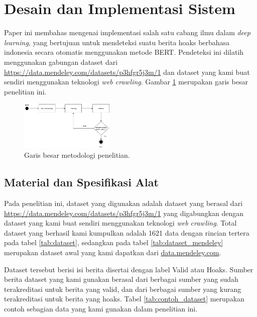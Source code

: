 \section{Desain dan Implementasi Sistem}
\label{sec:desainimplementasi}

Paper ini membahas mengenai implementasi salah satu cabang ilmu dalam \textit{deep learning}, yang bertujuan untuk mendeteksi suatu berita hoaks berbahasa indonesia secara otomatis menggunakan metode BERT. Pendeteksi ini dilatih menggunakan gabungan dataset dari \url{https://data.mendeley.com/datasets/p3hfgr5j3m/1} dan dataset yang kami buat sendiri menggunakan teknologi \textit{web crawling}. Gambar \ref{fig:metodologi} merupakan garis besar penelitian ini.

\begin{figure} [ht]
    \centering
    \includegraphics[width=0.4\textwidth]{gambar/Metodologi.png}
    \caption{Garis besar metodologi penelitian.}
    \label{fig:metodologi}
\end{figure}

\subsection{Material dan Spesifikasi Alat}

Pada penelitian ini, dataset yang digunakan adalah dataset yang berasal dari \url{https://data.mendeley.com/datasets/p3hfgr5j3m/1} yang digabungkan dengan dataset yang kami buat sendiri menggunakan teknologi \textit{web crawling}. Total dataset yang berhasil kami kumpulkan adalah 1621 data dengan rincian tertera pada tabel \ref{tab:dataset}, sedangkan pada tabel \ref{tab:dataset_mendeley} merupakan dataset awal yang kami dapatkan dari \url{data.mendeley.com}.

Dataset tersebut berisi isi berita disertai dengan label Valid atau Hoaks. Sumber berita dataset yang kami gunakan berasal dari berbagai sumber yang sudah terakreditasi untuk berita yang valid, dan dari berbagai sumber yang kurang terakreditasi untuk berita yang hoaks. Tabel \ref{tab:contoh_dataset} merupakan contoh sebagian data yang kami gunakan dalam penelitian ini.

